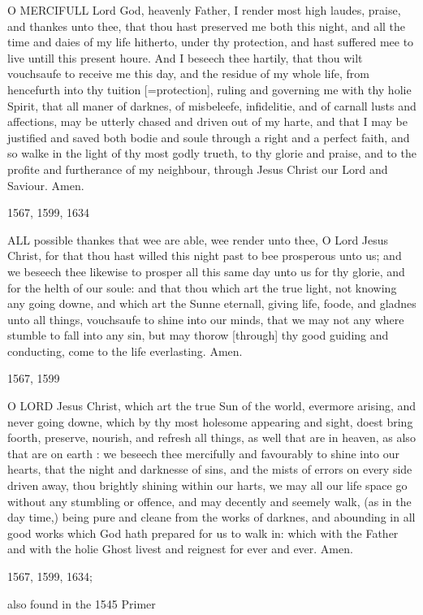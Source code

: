 O
MERCIFULL Lord God, heavenly Father, I render most high laudes, praise,
and thankes unto thee, that thou hast preserved me both this night, and
all the time and daies of my life hitherto, under thy protection, and
hast suffered mee to live untill this present houre. And I beseech thee
hartily, that thou wilt vouchsaufe to receive me this day, and the residue
of my whole life, from hencefurth into thy tuition
[=protection], ruling and governing me with thy holie Spirit, that
all maner of darknes, of misbeleefe, infidelitie, and of carnall lusts
and affections, may be utterly chased and driven out of my harte, and
that I may be justified and saved both bodie and soule through a right
and a perfect faith, and so walke in the light of thy most godly trueth,
to thy glorie and praise, and to the profite and furtherance of my neighbour,
through Jesus Christ our Lord and Saviour. Amen.

1567,
1599, 1634

ALL
possible thankes that wee are able, wee render unto thee, O Lord Jesus Christ,
for that thou hast willed this night past to bee prosperous unto us; and
we beseech thee likewise to prosper all this same day unto us for thy glorie,
and for the helth of our soule: and that thou which art the true light,
not knowing any going downe, and which art the Sunne eternall, giving life,
foode, and gladnes unto all things, vouchsaufe to shine into our minds,
that we may not any where stumble to fall into any sin, but may thorow [through]
thy good guiding and conducting, come to the life everlasting. Amen.

1567,
1599

O
LORD Jesus Christ, which art the true Sun of the world, evermore arising,
and never going downe, which by thy most holesome appearing and sight, doest
bring foorth, preserve, nourish, and refresh all things, as well that are
in heaven, as also that are on earth : we beseech thee mercifully and favourably
to shine into our hearts, that the night and darknesse of sins, and the
mists of errors on every side driven away, thou brightly shining within
our harts, we may all our life space go without any stumbling or offence,
and may decently and seemely walk, (as in the day time,) being pure and
cleane from the works of darknes, and abounding in all good works which
God hath prepared for us to walk in: which with the Father and with the
holie Ghost livest and reignest for ever and ever. Amen.

1567,
1599, 1634;

also found in the 1545 Primer

